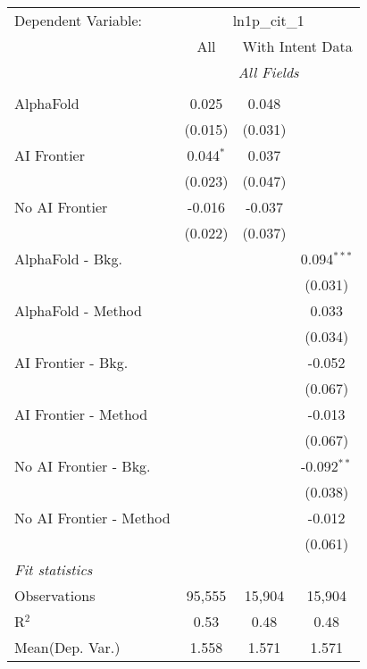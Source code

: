 \begingroup
\centering
\begin{tabular}{lccc}
   \tabularnewline \midrule \midrule
   Dependent Variable: & \multicolumn{3}{c}{ln1p\_cit\_1}\\
 & \multicolumn{1}{c}{All} & \multicolumn{2}{c}{With Intent Data} \\
\cmidrule(lr){2-2} \cmidrule(lr){3-4}
 & \multicolumn{3}{c}{\textit{All Fields}} \\ \\
   AlphaFold               & 0.025       & 0.048   &   \\   
                           & (0.015)     & (0.031) &   \\   
   AI Frontier             & 0.044$^{*}$ & 0.037   &   \\   
                           & (0.023)     & (0.047) &   \\   
   No AI Frontier          & -0.016      & -0.037  &   \\   
                           & (0.022)     & (0.037) &   \\   
   AlphaFold - Bkg.        &             &         & 0.094$^{***}$\\   
                           &             &         & (0.031)\\   
   AlphaFold - Method      &             &         & 0.033\\   
                           &             &         & (0.034)\\   
   AI Frontier - Bkg.      &             &         & -0.052\\   
                           &             &         & (0.067)\\   
   AI Frontier - Method    &             &         & -0.013\\   
                           &             &         & (0.067)\\   
   No AI Frontier - Bkg.   &             &         & -0.092$^{**}$\\   
                           &             &         & (0.038)\\   
   No AI Frontier - Method &             &         & -0.012\\   
                           &             &         & (0.061)\\   
   \midrule
   \emph{Fit statistics}\\
   Observations            & 95,555      & 15,904  & 15,904\\  
   R$^2$                   & 0.53        & 0.48    & 0.48\\  
Mean(Dep. Var.) & 1.558 & 1.571 & 1.571 \\
   

\end{tabular}
